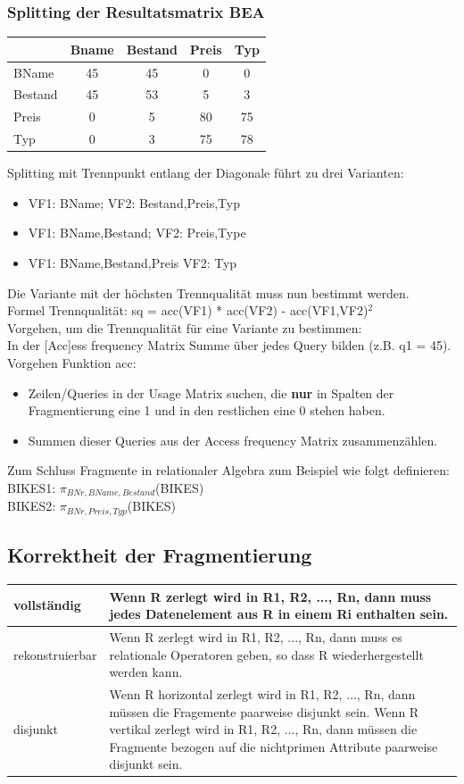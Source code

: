 \documentclass[a4paper,11pt]{article}
\begin{document}
\subsubsection{Splitting der Resultatsmatrix BEA}
\begin{tabular}{|l||c|c|c|c|}
\hline
&Bname&Bestand&Preis&Typ\\ \hline
BName & 45 & 45 & 0 & 0 \\ \hline
Bestand & 45 & 53 & 5 & 3 \\ \hline
Preis & 0 & 5 & 80 & 75 \\ \hline
Typ & 0 & 3 & 75 & 78 \\ \hline
\end{tabular}
Splitting mit Trennpunkt entlang der Diagonale führt zu drei Varianten:\\
\begin{itemize}
\item VF1: BName; VF2: Bestand,Preis,Typ
\item VF1: BName,Bestand; VF2: Preis,Type
\item VF1: BName,Bestand,Preis VF2: Typ
\end{itemize}
Die Variante mit der höchsten Trennqualität muss nun bestimmt werden.\\
Formel Trennqualität: sq = acc(VF1) * acc(VF2) - acc(VF1,VF2)$^{2}$\\
Vorgehen, um die Trennqualität für eine Variante zu bestimmen:\\
In der [Acc]ess frequency Matrix Summe über jedes Query bilden (z.B. q1 = 45).\\
Vorgehen Funktion acc:
\begin{itemize}
\item Zeilen/Queries in der Usage Matrix suchen, die \textbf{nur} in Spalten der Fragmentierung eine 1 und in den restlichen eine 0 stehen haben.
\item Summen dieser Queries aus der Access frequency Matrix zusammenzählen.
\end{itemize}
Zum Schluss Fragmente in relationaler Algebra zum Beispiel wie folgt definieren:\\
BIKES1: $\pi_{BNr,BName,Bestand}$(BIKES)\\
BIKES2: $\pi_{BNr,Preis,Typ}$(BIKES)
\subsection{Korrektheit der Fragmentierung}
\begin{tabular}{| p{5cm} | p{10cm} |}
\hline
vollständig &
Wenn R zerlegt wird in R1, R2, ..., Rn, dann muss jedes Datenelement aus R in einem Ri enthalten sein.\\ \hline
rekonstruierbar &
Wenn R zerlegt wird in R1, R2, ..., Rn, dann muss es relationale Operatoren geben, so dass R wiederhergestellt werden kann.\\ \hline
disjunkt &
Wenn R horizontal zerlegt wird in R1, R2, ..., Rn, dann müssen die Fragemente paarweise disjunkt sein.\newline
Wenn R vertikal zerlegt wird in R1, R2, ..., Rn, dann müssen die Fragmente bezogen auf die nichtprimen Attribute paarweise disjunkt sein.\\ \hline
\end{tabular}
\end{document}
